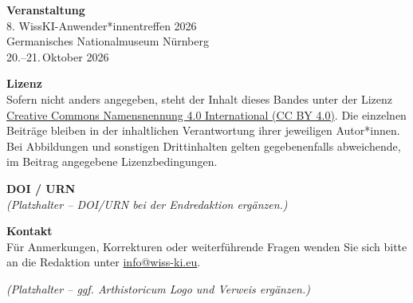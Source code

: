 \textbf{Veranstaltung}\\
8. WissKI-Anwender*innentreffen 2026\\
Germanisches Nationalmuseum Nürnberg\\
20.--21.\,Oktober 2026

\vspace{0.5cm}

\textbf{Lizenz}\\
Sofern nicht anders angegeben, steht der Inhalt dieses Bandes unter der Lizenz \href{https://creativecommons.org/licenses/by/4.0/deed.de}{Creative Commons Namensnennung 4.0 International (CC BY 4.0)}. Die einzelnen Beiträge bleiben in der inhaltlichen Verantwortung ihrer jeweiligen Autor*innen. Bei Abbildungen und sonstigen Drittinhalten gelten gegebenenfalls abweichende, im Beitrag angegebene Lizenzbedingungen.

\vspace{0.5cm}

\textbf{DOI / URN}\\
\textit{(Platzhalter -- DOI/URN bei der Endredaktion ergänzen.)}

\vspace{0.5cm}

\textbf{Kontakt}\\
Für Anmerkungen, Korrekturen oder weiterführende Fragen wenden Sie sich bitte an die Redaktion unter \href{mailto:info@wiss-ki.eu}{info@wiss-ki.eu}.


\textit{(Platzhalter -- ggf. Arthistoricum Logo und Verweis ergänzen.)}

\clearpage
\pagestyle{vornmaterial}
